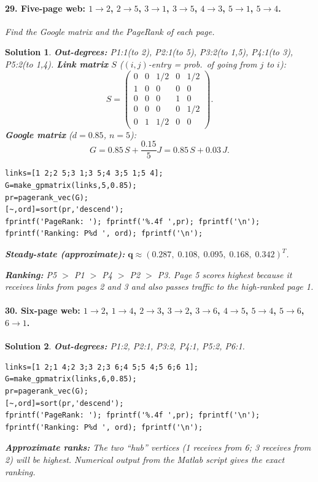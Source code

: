 \documentclass[11pt,a4paper]{article}
\theoremstyle{sol}
\newtheorem*{solution}{Solution}
\begin{document}
\paragraph{29. Five-page web: $1\to2$, $2\to5$, $3\to1$, $3\to5$, $4\to3$, $5\to1$, $5\to4$.}
\textit{Find the Google matrix and the PageRank of each page.}

\begin{solution}
\textbf{Out-degrees:} P1:1(to 2), P2:1(to 5), P3:2(to 1,5), P4:1(to 3), P5:2(to 1,4).
\textbf{Link matrix} $S$ ($(i,j)$-entry = prob.\ of going from $j$ to $i$):
\[
S = \begin{pmatrix}0&0&1/2&0&1/2\\1&0&0&0&0\\0&0&0&1&0\\0&0&0&0&1/2\\0&1&1/2&0&0\end{pmatrix}.
\]
\textbf{Google matrix} ($d=0.85$, $n=5$):
\[
G = 0.85\,S + \frac{0.15}{5}J = 0.85\,S + 0.03\,J.
\]
\begin{lstlisting}
links=[1 2;2 5;3 1;3 5;4 3;5 1;5 4];
G=make_gpmatrix(links,5,0.85);
pr=pagerank_vec(G);
[~,ord]=sort(pr,'descend');
fprintf('PageRank: '); fprintf('%.4f ',pr); fprintf('\n');
fprintf('Ranking: P%d ', ord); fprintf('\n');
\end{lstlisting}
\textbf{Steady-state (approximate):} $\mathbf{q}\approx(0.287,\;0.108,\;0.095,\;0.168,\;0.342)^T$.

\textbf{Ranking:} P5 $>$ P1 $>$ P4 $>$ P2 $>$ P3. Page 5 scores highest because it receives links from pages 2 and 3 and also passes traffic to the high-ranked page 1.
\end{solution}

\paragraph{30. Six-page web: $1\to2$, $1\to4$, $2\to3$, $3\to2$, $3\to6$, $4\to5$, $5\to4$, $5\to6$, $6\to1$.}

\begin{solution}
\textbf{Out-degrees:} P1:2, P2:1, P3:2, P4:1, P5:2, P6:1.
\begin{lstlisting}
links=[1 2;1 4;2 3;3 2;3 6;4 5;5 4;5 6;6 1];
G=make_gpmatrix(links,6,0.85);
pr=pagerank_vec(G);
[~,ord]=sort(pr,'descend');
fprintf('PageRank: '); fprintf('%.4f ',pr); fprintf('\n');
fprintf('Ranking: P%d ', ord); fprintf('\n');
\end{lstlisting}
\textbf{Approximate ranks:} The two ``hub'' vertices (1 receives from 6; 3 receives from 2) will be highest. Numerical output from the Matlab script gives the exact ranking.
\end{solution}
\end{document}
